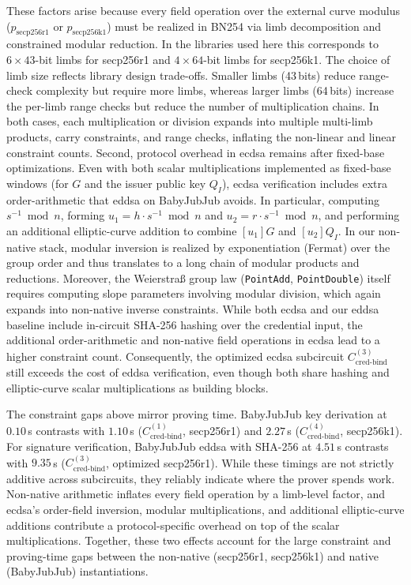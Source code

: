 These factors arise because every field operation over the external curve modulus ($p_{\text{secp256r1}}$ or $p_{\text{secp256k1}}$) must be realized in BN254 via limb decomposition and constrained modular reduction. In the libraries used here this corresponds to $6\times 43$-bit limbs for secp256r1 and $4\times 64$-bit limbs for secp256k1. The choice of limb size reflects library design trade-offs. Smaller limbs (43\,bits) reduce range-check complexity but require more limbs, whereas larger limbs (64\,bits) increase the per-limb range checks but reduce the number of multiplication chains. In both cases, each multiplication or division expands into multiple multi-limb products, carry constraints, and range checks, inflating the non-linear and linear constraint counts. Second, protocol overhead in \acrshort{ecdsa} remains after fixed-base optimizations. Even with both scalar multiplications implemented as fixed-base windows (for $G$ and the issuer public key $Q_I$), \acrshort{ecdsa} verification includes extra order-arithmetic that \acrshort{eddsa} on BabyJubJub avoids. In particular, computing $s^{-1}\bmod n$, forming $u_1 = h\cdot s^{-1}\bmod n$ and $u_2 = r\cdot s^{-1}\bmod n$, and performing an additional elliptic-curve addition to combine $[u_1]G$ and $[u_2]Q_I$. In our non-native stack, modular inversion is realized by exponentiation (Fermat) over the group order and thus translates to a long chain of modular products and reductions. Moreover, the Weierstraß group law (\texttt{PointAdd}, \texttt{PointDouble}) itself requires computing slope parameters involving modular division, which again expands into non-native inverse constraints. While both \acrshort{ecdsa} and our \acrshort{eddsa} baseline include in-circuit SHA-256 hashing over the credential input, the additional order-arithmetic and non-native field operations in \acrshort{ecdsa} lead to a higher constraint count. Consequently, the optimized \acrshort{ecdsa} subcircuit $C_{\text{cred-bind}}^{(3)}$ still exceeds the cost of \acrshort{eddsa} verification, even though both share hashing and elliptic-curve scalar multiplications as building blocks.

\medskip
The constraint gaps above mirror proving time. BabyJubJub key derivation at $0.10$\,s contrasts with $1.10$\,s ($C_{\text{cred-bind}}^{(1)}$, secp256r1) and $2.27$\,s ($C_{\text{cred-bind}}^{(4)}$, secp256k1). For signature verification, BabyJubJub \acrshort{eddsa} with SHA-256 at $4.51$\,s contrasts with $9.35$\,s ($C_{\text{cred-bind}}^{(3)}$, optimized secp256r1). While these timings are not strictly additive across subcircuits, they reliably indicate where the prover spends work. Non-native arithmetic inflates every field operation by a limb-level factor, and \acrshort{ecdsa}’s order-field inversion, modular multiplications, and additional elliptic-curve additions contribute a protocol-specific overhead on top of the scalar multiplications. Together, these two effects account for the large constraint and proving-time gaps between the non-native (secp256r1, secp256k1) and native (BabyJubJub) instantiations.


